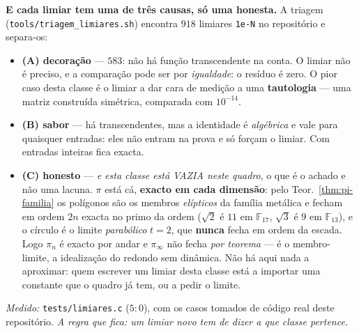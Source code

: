 \documentclass[11pt,a4paper]{article}
\newcommand{\code}[1]{\texttt{\small #1}}
\begin{document}
\textbf{E cada limiar tem uma de três causas, só uma honesta.} A triagem
(\code{tools/triagem\_limiares.sh}) encontra $918$ limiares
\code{1e-N} no repositório e separa-os:
\begin{itemize}
\item \textbf{(A) decoração} --- $583$: não há função transcendente na
conta. O limiar não é preciso, e a comparação pode ser por
\emph{igualdade}: o resíduo é zero. O pior caso desta classe é o limiar
a dar cara de medição a uma \textbf{tautologia} --- uma matriz
construída simétrica, comparada com $10^{-14}$.
\item \textbf{(B) sabor} --- há transcendentes, mas a identidade é
\emph{algébrica} e vale para quaisquer entradas: eles não entram na prova
e só forçam o limiar. Com entradas inteiras fica exacta.
\item \textbf{(C) honesto} --- \emph{e esta classe está VAZIA neste quadro},
o que é o achado e não uma lacuna. $\pi$ está cá, \textbf{exacto em cada
dimensão}: pelo Teor.~\ref{thm:pi-familia} os polígonos são os membros
\emph{elípticos} da família metálica e fecham em ordem $2n$ exacta no
primo da ordem ($\sqrt2$ é $11$ em $\mathbb{F}_{17}$, $\sqrt3$ é $9$ em
$\mathbb{F}_{13}$), e o círculo é o limite \emph{parabólico} $t=2$, que
\textbf{nunca} fecha em ordem da escada. Logo $\pi_n$ é exacto por andar e
$\pi_\infty$ não fecha \emph{por teorema} --- é o membro-limite, a
idealização do redondo sem dinâmica. Não há aqui nada a aproximar: quem
escrever um limiar desta classe está a importar uma constante que o
quadro já tem, ou a pedir o limite.
\end{itemize}
\emph{Medido:} \code{tests/limiares.c} ($5{:}0$), com os casos tomados de
código real deste repositório. \emph{A regra que fica: um limiar novo tem
de dizer a que classe pertence.}
\end{document}

